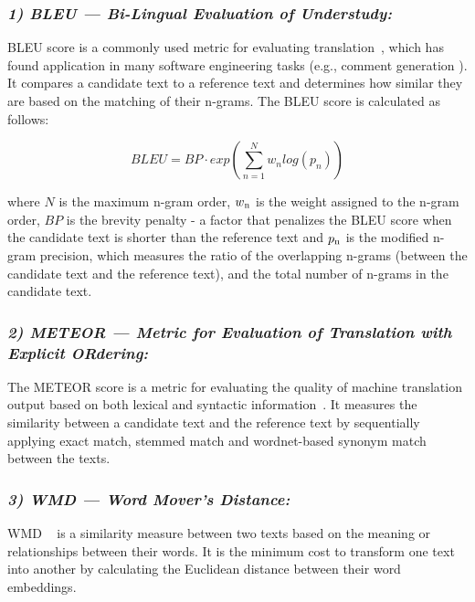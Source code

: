 \subsubsection{\emph{\textit{1) BLEU --- Bi-Lingual Evaluation of Understudy: }}}
\acrshort{BLEU} score is a commonly used metric for evaluating translation~\cite{papineni2002bleu}, which has found application in many software engineering tasks (e.g., comment generation \cite{hu2020deep}). It compares a candidate text to a reference text and determines how similar they are based on the matching of their n-grams. The \acrshort{BLEU} score is calculated as follows:\par

\begin{equation}
BLEU = BP \cdot exp \left ( \sum_{n=1}^{N}w_{n}log(p_{n}) \right )
\end{equation}

where $N$ is the maximum n-gram order, $w\textsubscript{n}$ is the weight assigned to the n-gram order, $BP$ is the brevity penalty - a factor that penalizes the \acrshort{BLEU} score when the candidate text is shorter than the reference text and $p\textsubscript{n}$ is the modified n-gram precision, which measures the ratio of the overlapping n-grams (between the candidate text and the reference text), and the total number of n-grams in the candidate text.\par



\subsubsection{\emph{ \textit{2) METEOR --- Metric for Evaluation of Translation with Explicit ORdering: }}}
The \acrshort{METEOR} score is a metric for evaluating the quality of machine translation output based on both lexical and syntactic information~\cite{banerjee2005meteor}. It measures the similarity between a candidate text and the reference text by sequentially applying exact match, stemmed match and wordnet-based synonym match between the texts. 


\subsubsection{\emph{\textit{3) WMD --- Word Mover's Distance: }}}
\acrshort{WMD} ~\cite{huang2016supervised} is a similarity measure between two texts based on the meaning or relationships between their words. It is the minimum cost to transform one text into another by calculating the  Euclidean distance between their word embeddings. 



